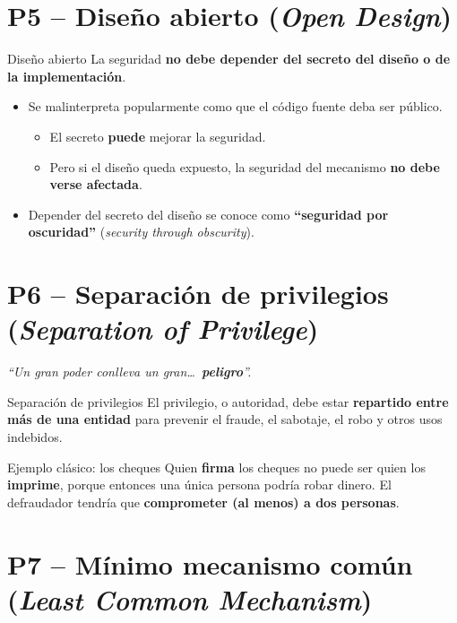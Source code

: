 \documentclass[11pt,a4paper]{report}
\begin{document}
\section{P5 -- Diseño abierto (\emph{Open Design})}

\begin{definicion}{Diseño abierto}
La seguridad \textbf{no debe depender del secreto del diseño o de la implementación}.
\end{definicion}
\begin{itemize}
  \item Se malinterpreta popularmente como que el código fuente deba ser público.
    \begin{itemize}
      \item El secreto \textbf{puede} mejorar la seguridad.
      \item Pero si el diseño queda expuesto, la seguridad del mecanismo \textbf{no debe verse afectada}.
    \end{itemize}
  \item Depender del secreto del diseño se conoce como \textbf{``seguridad por oscuridad''} (\emph{security through obscurity}).
\end{itemize}

\section{P6 -- Separación de privilegios (\emph{Separation of Privilege})}

\begin{center}
\emph{``Un gran poder conlleva un gran\dots\ \textbf{peligro}''.}
\end{center}

\begin{definicion}{Separación de privilegios}
El privilegio, o autoridad, debe estar \textbf{repartido entre más de una entidad} para prevenir el fraude, el sabotaje, el robo y otros usos indebidos.
\end{definicion}

\begin{ejemplo}{Ejemplo clásico: los cheques}
Quien \textbf{firma} los cheques no puede ser quien los \textbf{imprime}, porque entonces una única persona podría robar dinero. El defraudador tendría que \textbf{comprometer (al menos) a dos personas}.
\end{ejemplo}

\section{P7 -- Mínimo mecanismo común (\emph{Least Common Mechanism})}
\end{document}
